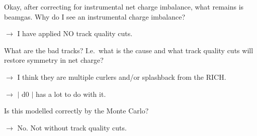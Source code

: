 \begin{slide*}

\slideframe{}
\huge
{}

\begin{minipage}[t]{\linewidth}
\LARGE

\vspace{1 cm}

Okay, after correcting for instrumental net charge imbalance, what
remains is beamgas.  Why do I see an instrumental charge imbalance?

$\longrightarrow$ I have applied NO track quality cuts.

\vspace{1 cm}

What are the bad tracks? I.e.\ what is the cause and what track
quality cuts will restore symmetry in net charge?

$\longrightarrow$ I think they are multiple curlers and/or splashback
from the RICH.

$\longrightarrow$ $\big|$ d0 $\big|$ has a lot to do with it.

\vspace{1 cm}

Is this modelled correctly by the Monte Carlo?

$\longrightarrow$ No. Not without track quality cuts.

\end{minipage}

\end{slide*}



